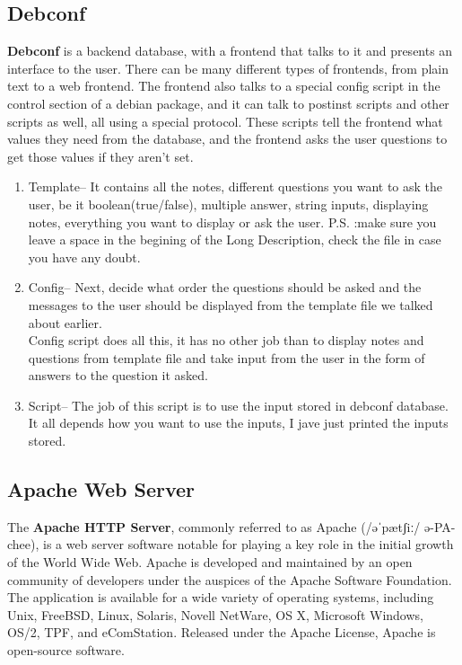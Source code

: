 \newpage
\subsection{Debconf}
{\bf Debconf} is a backend database, with a frontend that talks to it and presents an interface to the user. There can be many different types of frontends, from plain text to a web frontend. The frontend also talks to a special config script in the control section of a debian package, and it can talk to postinst scripts and other scripts as well, all using a special protocol. These scripts tell the frontend what values they need from the database, and the frontend asks the user questions to get those values if they aren't set. 
\begin{enumerate}
\item Template-- It contains all the notes, different questions you want to ask the user, be it boolean(true/false), multiple answer, string inputs, displaying notes, everything you want to display or ask the user. 
P.S. :make sure you leave a space in the begining of the Long Description, check the file in case you have any doubt. 
\item Config-- Next, decide what order the questions should be asked and the messages to the user should be displayed from the template file we talked about earlier.\\
Config script does all this, it has no other job than to display notes and questions from template file and take input from the user in the form of answers to the question it asked. 
\item Script-- The job of this script is to use the input stored in debconf database. It all depends how you want to use the inputs, I jave just printed the inputs stored. 
\end{enumerate}
\newpage

\subsection{Apache Web Server}
The {\bf Apache HTTP Server}, commonly referred to as Apache (/əˈpætʃiː/ ə-PA-chee), is a web server software notable for playing a key role in the initial growth of the World Wide Web. Apache is developed and maintained by an open community of developers under the auspices of the Apache Software Foundation. The application is available for a wide variety of operating systems, including Unix, FreeBSD, Linux, Solaris, Novell NetWare, OS X, Microsoft Windows, OS/2, TPF, and eComStation. Released under the Apache License, Apache is open-source software.

